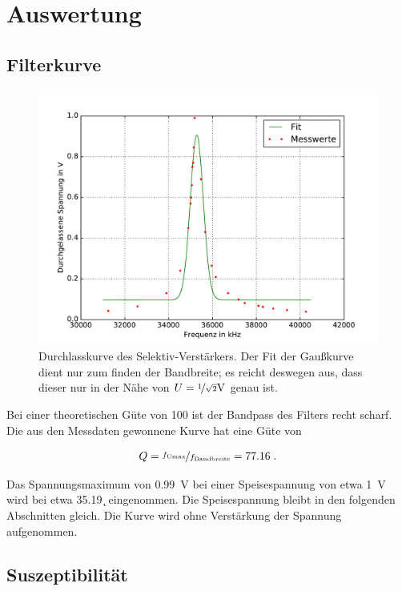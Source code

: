 \section{Auswertung}
\label{sec:Auswertung}

	\subsection{Filterkurve}
	\label{sub:Filterkurve}
		\begin{figure}[H]
			\centering
			\includegraphics[width=\textwidth]{../plots/amplifier.pdf}
			\caption{Durchlasskurve des Selektiv-Verstärkers. Der Fit der Gaußkurve dient nur zum finden der Bandbreite; es reicht deswegen aus, dass dieser nur in der Nähe von $U = \nicefrac{1}{\sqrt{2}}\si{\V}$ genau ist.}
			\label{fig:_plots_amplifier_pdf_}
		\end{figure}

		Bei einer theoretischen Güte von 100 ist der Bandpass des Filters recht scharf. Die aus den Messdaten gewonnene Kurve hat eine Güte von

		\begin{align}\label{equ:guete}
			Q=\nicefrac{f_\text{Umax}}{f_\text{Bandbreite}} = 77.16 \;.
		\end{align}

		Das Spannungsmaximum von \SI{0.99}{\V} bei einer Speisespannung von etwa \SI{1}{\V} wird bei etwa \SI{35.19}{\k\Hz} eingenommen. Die Speisespannung bleibt in den folgenden Abschnitten gleich.
		Die Kurve wird ohne Verstärkung der Spannung aufgenommen.

	\subsection{Suszeptibilität}
	\label{sub:suszeptibilität}
		
